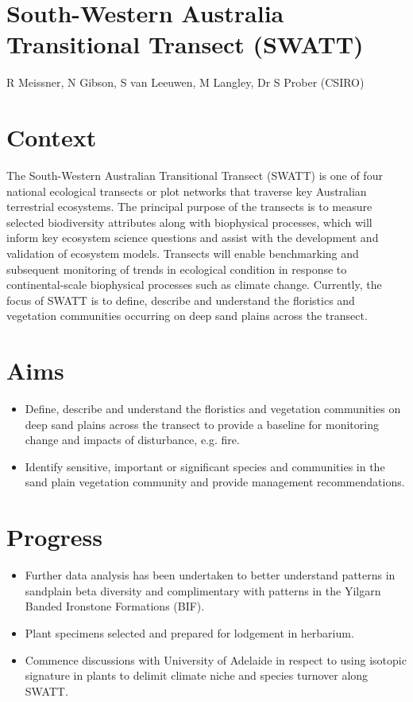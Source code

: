 \documentclass[version=last,
    paper=a4, %
    10pt, %
    usenames,
    dvipsnames,
    oneside, %
    headings=openany, %
    DIV=15 %
]{scrbook}
\begin{document}
\section*{South-Western Australia Transitional Transect (SWATT)
}

R Meissner, N Gibson, S van Leeuwen, M Langley, Dr S Prober (CSIRO)


\section*{Context}
The South-Western Australian Transitional Transect (SWATT) is one of
four national ecological transects or plot networks that traverse key
Australian terrestrial ecosystems. The principal purpose of the
transects is to measure selected biodiversity attributes along with
biophysical processes, which will inform key ecosystem science questions
and assist with the development and validation of ecosystem models.
Transects will enable benchmarking and subsequent monitoring of trends
in ecological condition in response to continental-scale biophysical
processes such as climate change. Currently, the focus of SWATT is to
define, describe and understand the floristics and vegetation
communities occurring on deep sand plains across the transect.



\section*{Aims}
\begin{itemize}
\itemsep1pt\parskip0pt
\item
  Define, describe and understand the floristics and vegetation
  communities on deep sand plains across the transect to provide a
  baseline for monitoring change and impacts of disturbance, e.g. fire.
\item
  Identify sensitive, important or significant species and communities
  in the sand plain vegetation community and provide management
  recommendations.
\end{itemize}



\section*{Progress}
\begin{itemize}
\itemsep1pt\parskip0pt
\item
  Further data analysis has been undertaken to better understand
  patterns in sandplain beta diversity and complimentary with patterns
  in the Yilgarn Banded Ironstone Formations (BIF).
\item
  Plant specimens selected and prepared for lodgement in herbarium.
\item
  Commence discussions with University of Adelaide in respect to using
  isotopic signature in plants to delimit climate niche and species
  turnover along SWATT.
\end{itemize}
\end{document}
